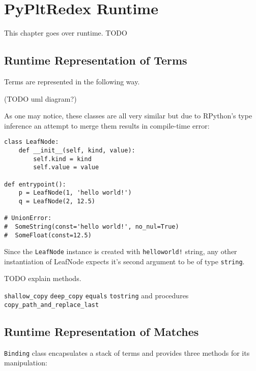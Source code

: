 \chapter{PyPltRedex Runtime}

This chapter goes over runtime. TODO

\section{Runtime Representation of Terms}

Terms are represented in the following way. 

(TODO uml diagram?) 

As one may notice, these classes are all very similar but due to RPython's type inference an attempt to merge them results in compile-time error:

\begin{lstlisting}
class LeafNode:
    def __init__(self, kind, value):
        self.kind = kind 
        self.value = value

def entrypoint():
    p = LeafNode(1, 'hello world!')
    q = LeafNode(2, 12.5)

# UnionError:
#  SomeString(const='hello world!', no_nul=True)
#  SomeFloat(const=12.5)
\end{lstlisting}

Since the \texttt{LeafNode} instance is created with \texttt{helloworld!} string, any other instantiation of LeafNode expects it's second argument to be of type \texttt{string}. 

TODO explain methods.

\texttt{shallow\_copy}
\texttt{deep\_copy} 
\texttt{equals}
\texttt{tostring}
and procedures
\texttt{copy\_path\_and\_replace\_last}

\section{Runtime Representation of Matches}

\texttt{Binding} class encapsulates a stack of terms and provides three methods for its manipulation:

